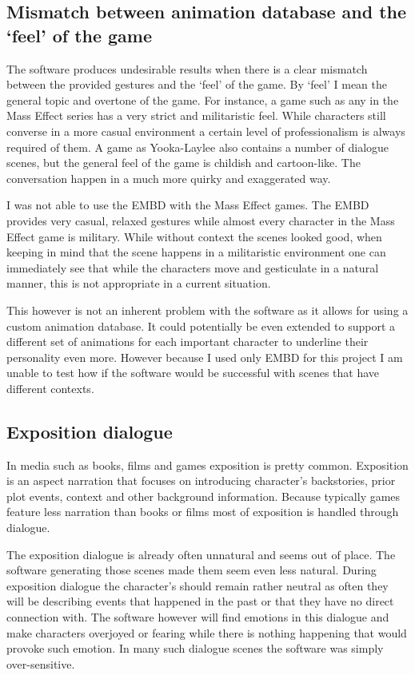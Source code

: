 \subsection{Mismatch between animation database and the `feel' of the game}
The software produces undesirable results when there is a clear mismatch between the provided gestures and the `feel' of the game. By `feel' I mean the general topic and overtone of the game. For instance, a game such as any in the Mass Effect series has a very strict and militaristic feel. While characters still converse in a more casual environment a certain level of professionalism is always required of them. A game as Yooka-Laylee also contains a number of dialogue scenes, but the general feel of the game is childish and cartoon-like. The conversation happen in a much more quirky and exaggerated way.

I was not able to use the EMBD with the Mass Effect games. The EMBD provides very casual, relaxed gestures while almost every character in the Mass Effect game is military. While without context the scenes looked good, when keeping in mind that the scene happens in a militaristic environment one can immediately see that while the characters move and gesticulate in a natural manner, this is not appropriate in a current situation.

This however is not an inherent problem with the software as it allows for using a custom animation database. It could potentially be even extended to support a different set of animations for each important character to underline their personality even more. However because I used only EMBD for this project I am unable to test how if the software would be successful with scenes that have different contexts.

\subsection{Exposition dialogue}
In media such as books, films and games exposition is pretty common. Exposition is an aspect narration that focuses on introducing character's backstories, prior plot events, context and other background information. Because typically games feature less narration than books or films most of exposition is handled through dialogue.

The exposition dialogue is already often unnatural and seems out of place. The software generating those scenes made them seem even less natural. During exposition dialogue the character's should remain rather neutral as often they will be describing events that happened in the past or that they have no direct connection with. The software however will find emotions in this dialogue and make characters overjoyed or fearing while there is nothing happening that would provoke such emotion. In many such dialogue scenes the software was simply over-sensitive.


